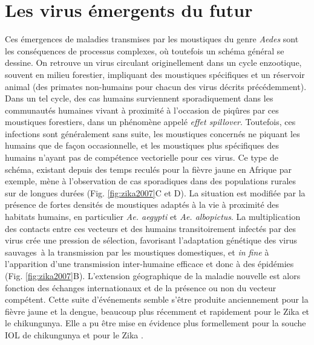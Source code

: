 \section[Virus émergents du futur]{Les virus émergents du futur}
\label{sec:emerg}
Ces émergences de maladies transmises par les moustiques du genre {\em Aedes} sont les conséquences de processus complexes, où toutefois un schéma général se dessine.
On retrouve un virus circulant originellement dans un cycle enzootique, souvent en milieu forestier, impliquant des moustiques spécifiques et un réservoir animal (des primates non-humains pour chacun des virus décrits précédemment).
Dans un tel cycle, des cas humains surviennent sporadiquement dans les communautés humaines vivant à proximité à l'occasion de piqûres par ces moustiques forestiers, dans un phénomène appelé \textit{effet spillover}.
Toutefois, ces infections sont généralement sans suite, les moustiques concernés ne piquant les humains que de façon occasionnelle, et les moustiques plus spécifiques des humains n'ayant pas de compétence vectorielle pour ces virus.
Ce type de schéma, existant depuis des temps reculés pour la fièvre jaune en Afrique par exemple, mène à l'observation de cas sporadiques dans des populations rurales sur de longues durées (Fig. \ref{fig:zika2007}C et D).
La situation est modifiée par la présence de fortes densités de moustiques adaptés à la vie à proximité des habitats humains, en particulier {\em Ae. aegypti} et {\em Ae. albopictus}.
La multiplication des contacts entre ces vecteurs et des humains transitoirement infectés par des virus crée une pression de sélection, favorisant l'adaptation génétique des virus \guillemotleft sauvages\guillemotright\ à la transmission par les moustiques \guillemotleft domestiques\guillemotright, et \textit{in fine} à l'apparition d'une transmission inter-humaine efficace et donc à des épidémies (Fig. \ref{fig:zika2007}B).
L'extension géographique de la maladie nouvelle est alors fonction des échanges internationaux et de la présence ou non du vecteur compétent.
Cette suite d'événements semble s'être produite anciennement pour la fièvre jaune et la dengue, beaucoup plus récemment et rapidement pour le Zika et le chikungunya.
Elle a pu être mise en évidence plus formellement pour la souche IOL de chikungunya \cite{tsetsarkin2011chikungunya} et pour le Zika \cite{liu2017evolutionary}.
